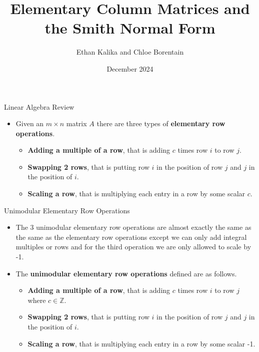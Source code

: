 \documentclass{beamer}
\title{Elementary Column Matrices and the Smith Normal Form}
\author{Ethan Kalika and Chloe Borentain}
\date{December 2024}
\begin{document}
\begin{frame}
    \titlepage
\end{frame}
\begin{frame}{Linear Algebra Review}
    \begin{itemize}
        \item Given an $m \times n$ matrix $A$ there are three types of \textbf{elementary row operations}.
        \begin{itemize}
            \item \textbf{Adding a multiple of a row}, that is adding $c$ times row $i$ to row $j$.
            \item \textbf{Swapping 2 rows}, that is putting row $i$ in the position of row $j$ and $j$ in the position of $i$.
            \item \textbf{Scaling a row}, that is multiplying each entry in a row by some scalar $c$.
        \end{itemize}
    \end{itemize}
\end{frame}
\begin{frame}{Unimodular Elementary Row Operations}
    \begin{itemize}
        \item The 3 unimodular elementary row operations are almost exactly the same as the same as the elementary row operations except we can only add integral multiples or rows and for the third operation we are only allowed to scale by -1.
        \item The \textbf{unimodular elementary row operations} defined are as follows.
        \begin{itemize}
            \item \textbf{Adding a multiple of a row}, that is adding $c$ times row $i$ to row $j$ where $c \in \mathbb{Z}$.
            \item \textbf{Swapping 2 rows}, that is putting row $i$ in the position of row $j$ and $j$ in the position of $i$.
            \item \textbf{Scaling a row}, that is multiplying each entry in a row by some scalar -1.
        \end{itemize}
    \end{itemize}
\end{frame}
\end{document}

